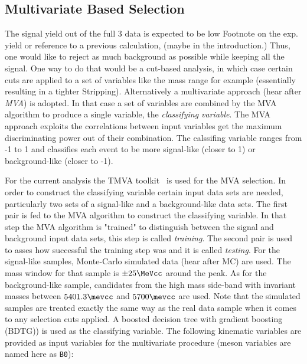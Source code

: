 

\subsection{Multivariate Based Selection}
\label{Multivariate_Based_Selection}

The \BsJpsiKst signal yield out of the full 3 \invfb data is expected to be low {\color{red} Footnote on the exp. yield or reference to a 
previous calculation, (maybe in the introduction.)} Thus, one would like to reject as much background as possible while keeping all the signal. 
One way to do that would be a cut-based analysis, in which case certain cuts are applied to a set of variables like the \Bs 
mass range for example (essentially resulting in a tighter Stripping). Alternatively a multivariate approach (hear after {\it MVA}) is adopted. 
In that case a set of variables are combined by the MVA algorithm to produce a single variable, the {\it classifying variable}. 
The MVA approach exploits the correlations between input variables get the maximum discriminating power out of their combination.
The calssifing variable ranges from -1 to 1 and classifies each event to be more signal-like (closer to 1) or background-like (closer to -1). 

For the current analysis the TMVA toolkit~\cite{TMVA} is used for the MVA selection. In order to construct the classifying variable certain 
input data sets are needed, particularly two sets of a signal-like and a background-like data sets. The first pair is fed to the MVA algorithm 
to construct the classifying variable. In that step the MVA algorithm is "trained" to distinguish between the signal and background input data sets,
this step is called {\it training}. The second pair is used to asses how successful the training step was and it is called {\it testing}. 
For the signal-like samples, \BsJpsiKst Monte-Carlo simulated data (hear after MC)
are used. The \Bs mass window for that sample is $\pm 25 \MeVcc$ around the \Bs peak. As for the background-like sample, candidates from the high mass side-band
with invariant masses between $5401.3\mevcc$ and $5700\mevcc$ are used. Note that the simulated samples are treated exactly the same way as the
real data sample when it comes to any selection cuts applied. A boosted decision tree with gradient boosting (BDTG){\color{red}{what is gradient boosting})}
is used as the classifying variable. The following kinematic variables are provided as input variables for the multivariate procedure (\Bs meson variables are 
named here as \texttt{B0}):

